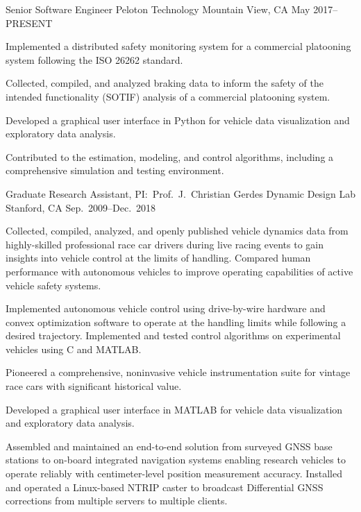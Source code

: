 \begin{cventries}
  \cventry%
    {Senior Software Engineer}
    {Peloton Technology}
    {Mountain View, CA}
    {May 2017--PRESENT}
    {
      \begin{cvitems}
        \item{Implemented a distributed safety monitoring system for a commercial platooning system following the ISO 26262 standard.}
        \item{Collected, compiled, and analyzed braking data to inform the safety of the intended functionality (SOTIF) analysis of a commercial platooning system.}
        \item{Developed a graphical user interface in Python for vehicle data visualization and exploratory data analysis.}
        \item{Contributed to the estimation, modeling, and control algorithms, including a comprehensive simulation and testing environment.}
      \end{cvitems}
    }

  \cventry%
    {Graduate Research Assistant, PI:\ Prof.~J.~Christian Gerdes}
    {Dynamic Design Lab}
    {Stanford, CA}
    {Sep.\ 2009--Dec.\ 2018}
    {
      \begin{cvitems}
        \item{Collected, compiled, analyzed, and openly published vehicle dynamics data from highly-skilled professional race car drivers during live racing events to gain insights into vehicle control at the limits of handling. Compared human performance with autonomous vehicles to improve operating capabilities of active vehicle safety systems.}
        \item{Implemented autonomous vehicle control using drive-by-wire hardware and convex optimization software to operate at the handling limits while following a desired trajectory. Implemented and tested control algorithms on experimental vehicles using C and MATLAB.}
        \item{Pioneered a comprehensive, noninvasive vehicle instrumentation suite for vintage race cars with significant historical value.}
        \item{Developed a graphical user interface in MATLAB for vehicle data visualization and exploratory data analysis.}
        \item{Assembled and maintained an end-to-end solution from surveyed GNSS base stations to on-board integrated navigation systems enabling research vehicles to operate reliably with centimeter-level position measurement accuracy. Installed and operated a Linux-based NTRIP caster to broadcast Differential GNSS corrections from multiple servers to multiple clients.}
      \end{cvitems}
    }


\end{cventries}
